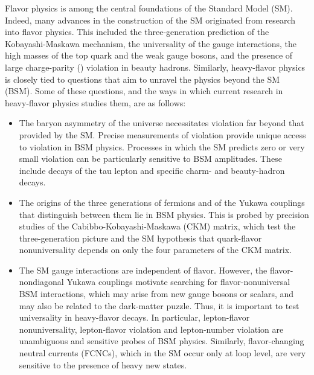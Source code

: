 \documentclass[12pt,a4paper]{article}
\begin{document}
Flavor physics is among the central foundations of the Standard Model
(SM). Indeed, many advances in the construction of the SM originated
from research into flavor physics. This included the three-generation prediction of the
Kobayashi-Maskawa mechanism, the universality of the gauge interactions, the high
masses of the top quark and the weak gauge bosons, and the presence of
large charge-parity (\CP) violation in beauty hadrons. Similarly, heavy-flavor physics is
closely tied to questions that aim to unravel the physics beyond the SM
(BSM). Some of these questions, and the ways in which current research
in heavy-flavor physics studies them, are as follows:
%
\begin{itemize}
\item The baryon asymmetry of the universe necessitates \CP violation
  far beyond that provided by the SM. Precise measurements of \CP
  violation provide unique access to \CP violation in BSM
  physics. Processes in which the SM predicts zero or very small \CP
  violation can be particularly sensitive to BSM amplitudes. These
  include decays of the tau lepton and specific charm- and
  beauty-hadron decays.

\item The origins of the three generations of fermions and of the
  Yukawa couplings that distinguish between them lie in BSM
  physics. This is probed by precision studies of the
  Cabibbo-Kobayashi-Maskawa (CKM) matrix, which test the
  three-generation picture and the SM hypothesis that quark-flavor nonuniversality depends on only the four parameters of the CKM matrix.

\item The SM gauge interactions are independent of flavor. However, the
  flavor-nondiagonal Yukawa couplings motivate searching for
  flavor-nonuniversal BSM interactions, which may arise from new
  gauge bosons or scalars, and may also be related to the dark-matter puzzle.
  Thus, it is important to test universality in heavy-flavor decays. In particular, lepton-flavor nonuniversality, lepton-flavor violation and lepton-number violation are unambiguous and sensitive probes of BSM physics. 
  Similarly, flavor-changing neutral currents (FCNCs), which in the SM occur only
  at loop level, are very sensitive to the presence of heavy new states. 
\end{itemize}
\end{document}
